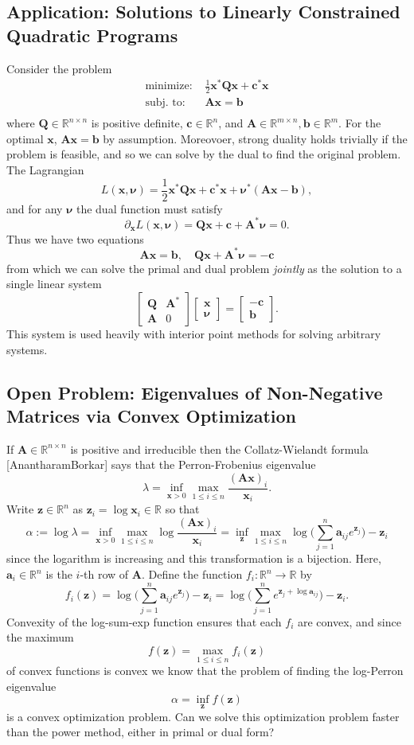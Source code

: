 \documentclass[10pt,letterpaper]{article}
\theoremstyle{definition}
\theoremstyle{remark}
\newcommand\R{\mathbb{R}}
\newcommand\m[1]{\begin{bmatrix} #1 \end{bmatrix}}
\newcommand\A{\boldsymbol{A}}
\newcommand\Q{\boldsymbol{Q}}
\newcommand\x{\boldsymbol{x}}
\newcommand\nub{\boldsymbol{\nu}}
\renewcommand\c{\boldsymbol{c}}
\renewcommand\b{\boldsymbol{b}}
\begin{document}
\subsection{Application: Solutions to Linearly Constrained Quadratic Programs}

Consider the problem
\begin{align*}
    \text{minimize: } & \frac{1}{2}\x^*\Q\x + \c^*\x\\
    \text{subj. to: } & \A\x = \b\\
\end{align*}
where $\Q\in\R^{n\times n}$ is positive definite, $\c\in\R^n$, and $\A\in\R^{m\times n}, \b\in\R^m$.
For the optimal $\x$, $\A\x = \b$ by assumption. Moreovoer, strong duality holds
trivially if the problem is feasible, and so we can solve by the dual to find the original
problem. The Lagrangian
\[
    L(\x,\nub) = \frac{1}{2}\x^*\Q\x + \c^*\x + \nub^*(\A\x-\b),
\]
and for any $\nub$ the dual function must satisfy
\[
    \partial_{\x} L(\x,\nub) = \Q\x + \c + \A^*\nub = 0.
\]
Thus we have two equations
\[
    \A\x = \b,\quad \Q\x + \A^*\nub = -\c
\]
from which we can solve the primal and dual problem \emph{jointly} as the solution to
a single linear system
\[
    \m{\Q & \A^*\\\A & 0}\m{\x\\\nub} = \m{-\c\\\b}.
\]
This system is used heavily with interior point methods for solving arbitrary systems.

\subsection{Open Problem: Eigenvalues of Non-Negative Matrices via Convex Optimization}

If $\boldsymbol{A}\in\mathbb{R}^{n\times n}$ is positive and irreducible then the Collatz-Wielandt formula [AnantharamBorkar] says that the Perron-Frobenius eigenvalue
$$\lambda = \inf_{\boldsymbol{x} > 0} \max_{1\leq i \leq n} \frac{(\boldsymbol{Ax})_i}{\boldsymbol{x}_i}.$$
Write $\boldsymbol{z}\in\mathbb{R}^n$ as $\boldsymbol{z}_i = \log\boldsymbol{x}_i \in\mathbb{R}$ so that
$$\alpha := \log\lambda = \inf_{\boldsymbol{x} > 0} \max_{1\leq i \leq n} \log\frac{(\boldsymbol{Ax})_i}{\boldsymbol{x}_i} = \inf_{\boldsymbol{z}} \max_{1\leq i \leq n} \log\biggl(\sum_{j=1}^n\boldsymbol{a}_{ij}e^{\boldsymbol{z}_j}\biggr) - \boldsymbol{z}_i$$
since the logarithm is increasing and this transformation is a bijection. Here, $\boldsymbol{a}_i\in\mathbb{R}^n$ is the $i$-th row of $\boldsymbol{A}$. Define the function $f_i : \mathbb{R}^n \to \mathbb{R}$ by
\[
  f_i(\boldsymbol{z}) = \log\biggl(\sum_{j=1}^n\boldsymbol{a}_{ij}e^{\boldsymbol{z}_j}\biggr) - \boldsymbol{z}_i = \log\biggl(\sum_{j=1}^n e^{\boldsymbol{z}_j + \log \boldsymbol{a}_{ij}}\biggr) - \boldsymbol{z}_i.
\]
Convexity of the log-sum-exp function ensures that each $f_i$ are convex, and since the maximum
\[
f(\boldsymbol{z}) = \max_{1\leq i \leq n} f_i(\boldsymbol{z})
\]
of convex functions is convex we know that the problem of finding the log-Perron eigenvalue
\[
\alpha = \inf_{\boldsymbol{z}} f(\boldsymbol{z})
\]
is a convex optimization problem. Can we solve this optimization problem faster than the power
method, either in primal or dual form?
\end{document}
